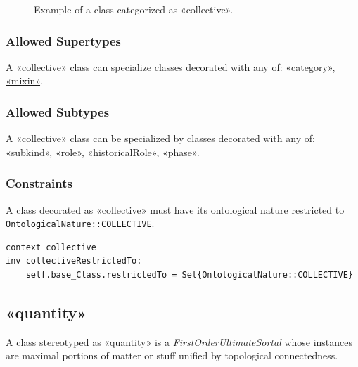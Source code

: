 \begin{figure}[h]
    \centering
    
    \caption{Example of a class categorized as «collective».}
    \label{fig:collective-example}
\end{figure}

\subsubsection{Allowed Supertypes}

A «collective» class can specialize classes decorated with any of: 
\hyperref[stereotype:category]{«category»}, \hyperref[stereotype:mixin]{«mixin»}.

\subsubsection{Allowed Subtypes}

A «collective» class can be specialized by classes decorated with any of:
\hyperref[stereotype:subkind]{«subkind»}, \hyperref[stereotype:role]{«role»}, \hyperref[stereotype:historicalRole]{«historicalRole»}, \hyperref[stereotype:phase]{«phase»}.

\subsubsection{Constraints}

\begin{constraint}
\label{collectiveRestrictedTo}
A class decorated as «collective» must have its ontological nature restricted to \texttt{OntologicalNature::COLLECTIVE}.

\begin{lstlisting}[language=OCL]
context collective 
inv collectiveRestrictedTo:
    self.base_Class.restrictedTo = Set{OntologicalNature::COLLECTIVE}
\end{lstlisting}
\end{constraint}

\subsection{«quantity»}
\label{stereotype:quantity}

A class stereotyped as «quantity» is a \hyperref[stereotype:firstOrderUltimateSortal]{\textit{FirstOrderUltimateSortal}} whose instances are maximal portions of matter or stuff unified by topological connectedness.

